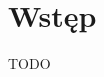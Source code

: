 \documentclass{standalone}
\begin{document}
\pagestyle{headings}

\section*{Wstęp}

TODO
\end{document}
